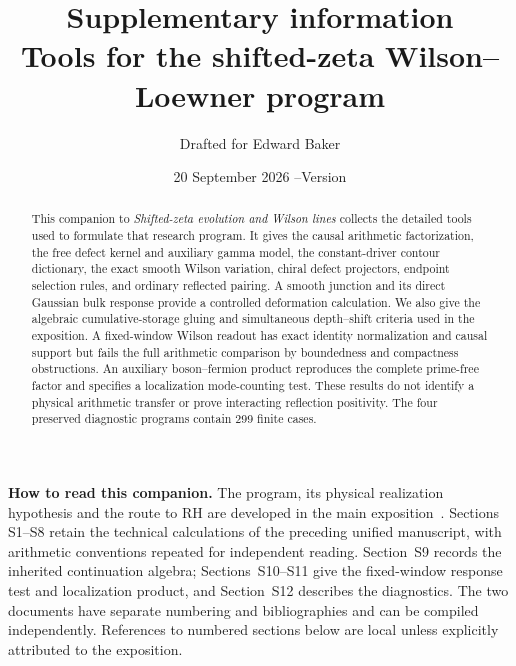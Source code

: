 \documentclass[11pt]{article}
\title{Supplementary information\\[3pt]
\large Tools for the shifted-zeta Wilson--Loewner program}
\author{Drafted for Edward Baker}
\date{20 September 2026 \quad--\quad Version \draftversion}
\begin{document}
\maketitle
\begin{abstract}
This companion to \emph{Shifted-zeta evolution and Wilson lines}
collects the detailed tools used to formulate that research program.
It gives the causal arithmetic factorization, the free defect kernel
and auxiliary gamma model, the constant-driver contour dictionary,
the exact smooth Wilson variation, chiral defect projectors, endpoint
selection rules, and ordinary reflected pairing. A smooth junction
and its direct Gaussian bulk response provide a controlled
deformation calculation. We also give the algebraic cumulative-storage
gluing and simultaneous depth--shift criteria used in the exposition.
A fixed-window Wilson readout has exact identity normalization and
causal support but fails the full arithmetic comparison by boundedness
and compactness obstructions. An auxiliary boson--fermion product
reproduces the complete prime-free factor and specifies a localization
mode-counting test. These results do not identify a physical arithmetic
transfer or prove interacting reflection positivity. The four
preserved diagnostic programs contain 299 finite cases.
\end{abstract}
\noindent\textbf{How to read this companion.}
The program, its physical realization hypothesis and the route to RH
are developed in the main exposition~\cite{Exposition}. Sections
S1--S8 retain the technical calculations of the preceding unified
manuscript, with arithmetic conventions repeated for independent
reading. Section~S9 records the inherited continuation algebra;
Sections~S10--S11 give the fixed-window response test and localization
product, and Section~S12 describes the diagnostics.
The two documents have separate
numbering and bibliographies and can be compiled independently.
References to numbered sections below are local unless explicitly
attributed to the exposition.
\tableofcontents














\end{document}

